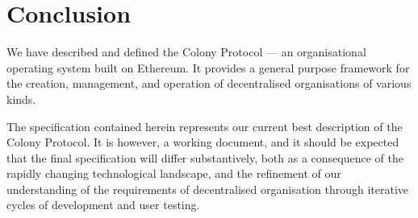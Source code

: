 \section{Conclusion}\label{sec:conclusion}

We have described and defined the Colony Protocol --- an organisational operating system built on Ethereum. It provides a general purpose framework for the creation, management, and operation of decentralised organisations of various kinds.

The specification contained herein represents our current best description of the Colony Protocol. It is however, a working document, and it should be expected that the final specification will differ substantively, both as a consequence of the rapidly changing technological landscape, and the refinement of our understanding of the requirements of decentralised organisation through iterative cycles of development and user testing.